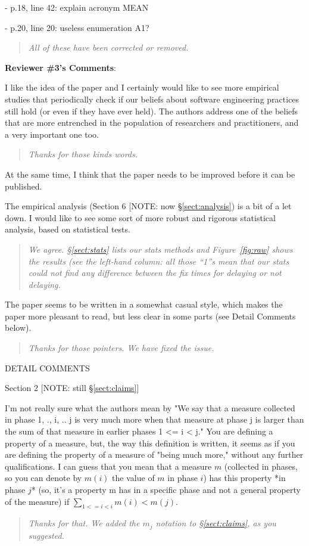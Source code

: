 \documentclass[smallcondensed]{svjour3}
\newcommand{\tion}[1]{\S\ref{sect:#1}}
\newcommand{\fig}[1]{Figure~\ref{fig:#1}}
\begin{document}
- p.18, line 42: explain acronym MEAN 

- p.20, line 20: useless enumeration A1?

\begin{quote}{\em
 All of these have been corrected or removed.
 }\end{quote}
 

{\bf  Reviewer \#3's Comments}: 

I like the idea of the paper and I certainly
would like to see more empirical studies that periodically
check if our beliefs about software engineering practices
still hold (or even if they have ever held). The authors
address one of the beliefs that are more entrenched in the
population of researchers and practitioners, and a very
important one too.


\begin{quote}{\em
Thanks for those kinds words.
 }\end{quote}

At the same time, I think that the paper needs to be
improved before it can be published.

The empirical analysis (Section 6 [NOTE: now \tion{analysis}) is a bit of a let down. I
would like to see some sort of more robust and rigorous
statistical analysis, based on statistical tests.



\begin{quote}{\em
We agree. \tion{stats} lists our stats methods and \fig{raw}
shows the results (see the left-hand column: all those ``1''s mean
that our stats could not find any difference between the fix times for
delaying or not delaying.
 }\end{quote}
 
 
The paper seems to be written in a somewhat casual style,
which makes the paper more pleasant to read, but less clear
in some parts (see Detail Comments below).

\begin{quote}{\em
Thanks for those pointers. We have fixed the issue.
 }\end{quote}

DETAIL COMMENTS

Section 2 [NOTE: still \tion{claims}]

I'm not really sure what the authors mean by "We say that a
measure collected in phase 1, ., i, .. j is very much more
when that measure at phase j is larger than the sum of that
measure in earlier phases 1 <= i < j." You are defining a
property of a measure, but, the way this definition is
written, it seems as if you are defining the property of a
measure of "being much more," without any further
qualifications.  I can guess that you mean that a measure
$m$ (collected in phases, so you can denote by $m(i)$ the
value of $m$ in phase $i$) has this property *in phase $j$*
(so, it's a property m has in a specific phase and not a
general property of the measure) if $\sum_{1 <= i < i} m(i)
< m(j)$. 
\begin{quote}{\em
Thanks for that. We added the $m_j$ notation to \tion{claims}, as you suggested.
 }\end{quote}
 
\end{document}
